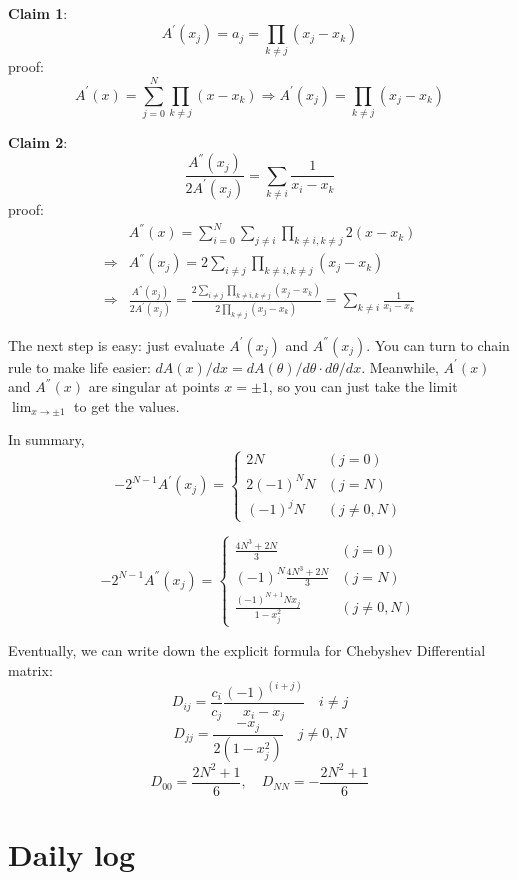   \textbf{Claim 1}: $$A^{'}(x_{j})=a_{j}=\prod_{k\neq j}(x_{j}-x_{k})$$
  proof: $$A^{'}(x)=\sum_{j=0}^{N}\prod_{k\neq j}(x-x_{k})\Rightarrow
  A^{'}(x_{j})=\prod_{k\neq j}(x_{j}-x_{k}) $$

 \textbf{Claim 2}: $$\frac{A^{''}(x_{j})}{2A^{'}(x_{j})}=\sum_{k\neq i}\frac{1}{x_{i}-x_{k}}$$
 proof:
 \begin{align*}
 & A^{''}(x)=\sum_{i=0}^{N}\sum_{j\neq i}\prod_{k\neq i, k\neq j}2(x-x_{k})\\
 \Rightarrow & A^{''}(x_{j})=2\sum_{i\neq j}\prod_{k\neq i, k\neq j}(x_{j}-x_{k})\\
 \Rightarrow & \frac{A^{''}(x_{j})}{2A^{'}(x_{j})}=
 \frac{2\sum_{i\neq j}\prod_{k\neq i, k\neq j}(x_{j}-x_{k})}{2\prod_{k\neq j}(x_{j}-x_{k})}
 =\sum_{k\neq i}\frac{1}{x_{i}-x_{k}}
  \end{align*}

 The next step is easy: just evaluate $A^{'}(x_j)$ and $A^{''}(x_j)$. You can turn to chain rule
 to make life easier: $dA(x)/dx=dA(\theta)/d\theta \cdot d\theta/dx$. Meanwhile,
 $A^{'}(x)$ and $A^{''}(x)$ are singular at points $x=\pm 1$, so you can just take the limit
 $\lim_{x\to \pm 1}$ to get the values.

 In summary,
  \[
   -2^{N-1}A^{'}(x_j)=
   \begin{cases}
    2N & (j=0)\\
    2(-1)^{N}N & (j=N)\\
    (-1)^{j}N & (j\neq 0,N)
   \end{cases}
  \]

  \[
   -2^{N-1}A^{''}(x_j)=
   \begin{cases}
    \frac{4N^3+2N}{3} & (j=0)\\
    (-1)^{N}\frac{4N^3+2N}{3}  & (j=N)\\
    \frac{(-1)^{N+1}Nx_{j}}{1-x_{j}^{2}} & (j\neq 0,N)
   \end{cases}
  \]

  Eventually, we can write down the explicit formula for Chebyshev Differential matrix:
  \[
   D_{ij}=\frac{c_i}{c_j}\frac{(-1)^(i+j)}{x_{i}-x_{j}} \quad i\neq j
  \]
  \[
   D_{jj}=\frac{-x_{j}}{2(1-x^{2}_{j})} \quad j\neq 0,N
  \]
  \[
   D_{00}= \frac{2N^2+1}{6} ,\quad D_{NN}= -\frac{2N^2+1}{6}
  \]








\section{Daily log}
\label{sect:dailyBlXD}

